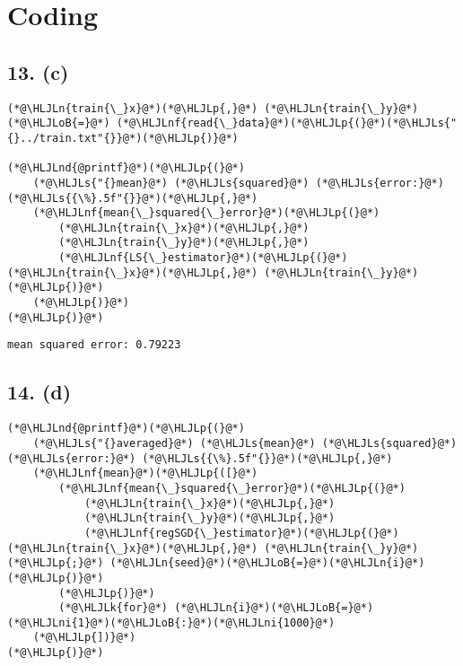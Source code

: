 \documentclass[12pt,a4paper]{article}
\newcommand{\HLJLk}[1]{\textcolor[RGB]{148,91,176}{\textbf{#1}}}
\newcommand{\HLJLn}[1]{#1}
\newcommand{\HLJLnd}[1]{\textcolor[RGB]{214,102,97}{#1}}
\newcommand{\HLJLnf}[1]{\textcolor[RGB]{66,102,213}{#1}}
\newcommand{\HLJLs}[1]{\textcolor[RGB]{201,61,57}{#1}}
\newcommand{\HLJLni}[1]{\textcolor[RGB]{59,151,46}{#1}}
\newcommand{\HLJLoB}[1]{\textcolor[RGB]{102,102,102}{\textbf{#1}}}
\newcommand{\HLJLp}[1]{#1}
\begin{document}
\section{Coding}


\subsection{13. (c)}

\begin{lstlisting}
(*@\HLJLn{train{\_}x}@*)(*@\HLJLp{,}@*) (*@\HLJLn{train{\_}y}@*) (*@\HLJLoB{=}@*) (*@\HLJLnf{read{\_}data}@*)(*@\HLJLp{(}@*)(*@\HLJLs{"{}../train.txt"{}}@*)(*@\HLJLp{)}@*)

(*@\HLJLnd{@printf}@*)(*@\HLJLp{(}@*)
    (*@\HLJLs{"{}mean}@*) (*@\HLJLs{squared}@*) (*@\HLJLs{error:}@*) (*@\HLJLs{{\%}.5f"{}}@*)(*@\HLJLp{,}@*)
    (*@\HLJLnf{mean{\_}squared{\_}error}@*)(*@\HLJLp{(}@*)
        (*@\HLJLn{train{\_}x}@*)(*@\HLJLp{,}@*) 
        (*@\HLJLn{train{\_}y}@*)(*@\HLJLp{,}@*)
        (*@\HLJLnf{LS{\_}estimator}@*)(*@\HLJLp{(}@*)(*@\HLJLn{train{\_}x}@*)(*@\HLJLp{,}@*) (*@\HLJLn{train{\_}y}@*)(*@\HLJLp{)}@*)
    (*@\HLJLp{)}@*)
(*@\HLJLp{)}@*)
\end{lstlisting}

\begin{lstlisting}
mean squared error: 0.79223
\end{lstlisting}


\subsection{14. (d)}

\begin{lstlisting}
(*@\HLJLnd{@printf}@*)(*@\HLJLp{(}@*)
    (*@\HLJLs{"{}averaged}@*) (*@\HLJLs{mean}@*) (*@\HLJLs{squared}@*) (*@\HLJLs{error:}@*) (*@\HLJLs{{\%}.5f"{}}@*)(*@\HLJLp{,}@*)
    (*@\HLJLnf{mean}@*)(*@\HLJLp{([}@*) 
        (*@\HLJLnf{mean{\_}squared{\_}error}@*)(*@\HLJLp{(}@*)
            (*@\HLJLn{train{\_}x}@*)(*@\HLJLp{,}@*) 
            (*@\HLJLn{train{\_}y}@*)(*@\HLJLp{,}@*) 
            (*@\HLJLnf{regSGD{\_}estimator}@*)(*@\HLJLp{(}@*)(*@\HLJLn{train{\_}x}@*)(*@\HLJLp{,}@*) (*@\HLJLn{train{\_}y}@*)(*@\HLJLp{;}@*) (*@\HLJLn{seed}@*)(*@\HLJLoB{=}@*)(*@\HLJLn{i}@*)(*@\HLJLp{)}@*)
        (*@\HLJLp{)}@*)
        (*@\HLJLk{for}@*) (*@\HLJLn{i}@*)(*@\HLJLoB{=}@*)(*@\HLJLni{1}@*)(*@\HLJLoB{:}@*)(*@\HLJLni{1000}@*)
    (*@\HLJLp{])}@*)
(*@\HLJLp{)}@*)
\end{lstlisting}
\end{document}
